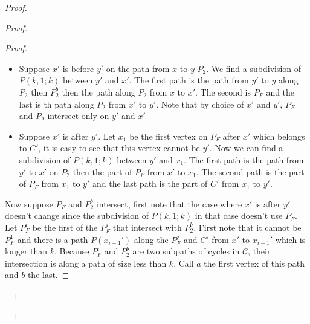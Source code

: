 \documentclass[utf8,10pt]{article}
\theoremstyle{plain}
\theoremstyle{definition}
\theoremstyle{remark}
\begin{document}
\begin{proof}
\begin{proof}
\begin{proof}
\begin{itemize}
	\item Suppose $x'$ is before $y'$ on the path from $x$ to $y$ $P_2$. We find a subdivision of $P(k,1;k)$ between $y'$ and $x'$.
	The first path is the path from $y'$ to $y$ along $P_2$ then $P_2^b$ then the path along $P_2$ from $x$ to $x'$. The second
	is $P_F$ and the last is th path along $P_2$ from $x'$ to $y'$. Note that by choice of $x'$ and $y'$, $P_F$ and $P_2$ intersect
	only on $y'$ and $x'$
	\item Suppose $x'$ is after $y'$. Let $x_1$ be the first vertex on $P_F$ after $x'$ which belongs to $C'$, it is easy to see that
	this vertex cannot be $y'$. Now we can find a subdivision of $P(k,1;k)$ between $y'$ and $x_1$. The first path is the path from $y'$
	to $x'$ on $P_2$ then the part of $P_F$ from $x'$ to $x_1$. The second path is the part of $P_F$ from $x_1$ to $y'$ and the last path is
	the part of $C'$ from $x_1$ to $y'$.
\end{itemize}

Now suppose $P_F$ and $P_2^b$ intersect, first note that the case where $x'$ is after $y'$ doesn't change since the subdivision
of $P(k,1;k)$ in that case doesn't use $P_F$.
Let $P_F^i$ be the first of the $P_F^j$ that intersect with $P_2^b$. First note that it cannot be $P_F^1$ and there is a path $P(x_{i-1}')$
along the $P_F^j$ and $C'$ from $x'$ to $x_{i-1}'$ which is longer than $k$.
Because $P_F^i$ and $P_2^b$ are two subpaths of cycles in $\mathcal{C}$, their intersection is along a path of size less than $k$.
Call $a$ the first vertex of this path and $b$ the last.


\end{proof}
\end{proof}
\end{proof}
\end{document}
